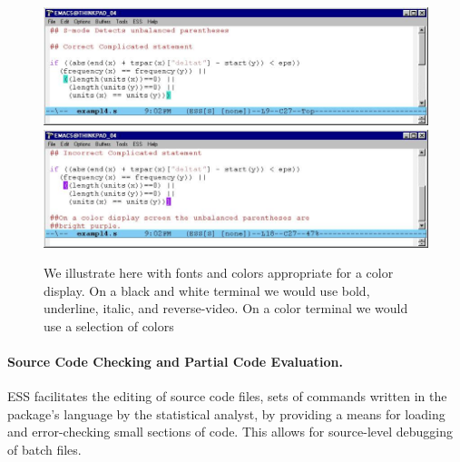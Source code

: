 \documentclass{article}
\begin{document}
\begin{figure}[thbp]
  \centering
  \includegraphics[angle=270,width=\textwidth]{font-cor-s}
  \includegraphics[angle=270,width=\textwidth]{font-incor-s}

  \caption{We illustrate here with fonts and colors appropriate for a
    color display.  On a black and white terminal we would use bold,
    underline, italic, and reverse-video.  On a color terminal we
    would use a selection of colors}
  \label{f.font}
\end{figure}

\paragraph{Source Code Checking and Partial Code Evaluation.}

ESS facilitates the editing of source code files, sets of commands
written in the package's language by the statistical analyst, by
providing a means for loading and error-checking small sections of
code.  This allows for source-level debugging of batch files.
\end{document}
